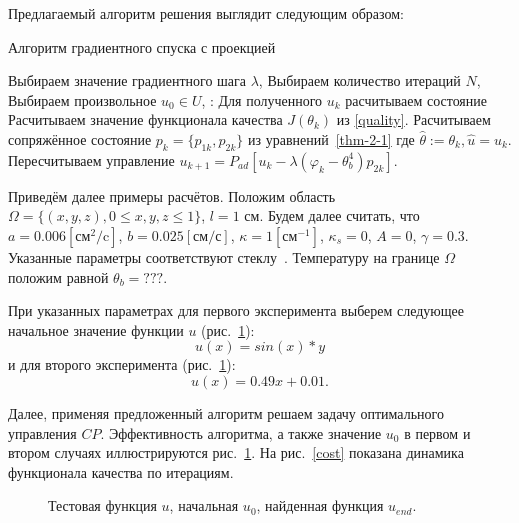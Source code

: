 \documentclass[10pt]{article}
\begin{document}
    Предлагаемый алгоритм решения выглядит следующим образом:
    \begin{algorithm}[H]
        \caption{Алгоритм градиентного спуска с проекцией}
        \begin{algorithmic}[1]
            \State Выбираем значение градиентного шага $\lambda$,
            \State Выбираем количество итераций $N$,
            \State Выбираем произвольное $u_0 \in U$,
            :
            \State Для полученного $u_k$ расчитываем состояние
            \State Расчитываем значение функционала качества $J(\theta_k)$ из \eqref{quality}.
            \State Расчитываем сопряжённое состояние $p_k=\{p_{1k},p_{2k}\}$ из
            уравнений~\eqref{thm-2-1} где $ \hat{\theta} := \theta_k, \hat{u}=u_k$.
            \State Пересчитываем управление
            $u_{k+1} = P_{ad}\left[ u_k - \lambda (\varphi_k - \theta_b^4)p_{2k} \right]$.
            \EndFor
        \end{algorithmic}
    \end{algorithm}
    Приведём далее примеры расчётов.
    Положим область $\Omega = \{(x, y, z), 0 \leq x, y, z \leq 1\}$, $l = 1$ см.
    Будем далее считать, что $a = 0.006[\text{см}^2/\text{c}]$, $b=0.025[\text{см}/\text{с}]$,
    $\kappa=1[\text{см}^{-1}]$, $\kappa_s = 0$, $A = 0$, $\gamma = 0.3$.
    Указанные параметры соответствуют стеклу~\cite{grenkin_13}.
    Температуру на границе $\Omega$ положим равной $\theta_b = ???$.

    При указанных параметрах для первого эксперимента выберем следующее начальное значение
    функции $u$ (рис.~\ref{control}):
    \begin{equation}
        \label{test_function_1}
        u(x)= sin(x) * y
    \end{equation}
    и для второго эксперимента (рис.~\ref{control}):
    \begin{equation}
        \label{test_function_2}
        u(x)=0.49x+0.01.
    \end{equation}

    Далее, применяя предложенный алгоритм решаем задачу оптимального управления $CP$.
    Эффективность алгоритма, а также значение $u_0$
    в первом и втором случаях иллюстрируются рис.~\ref{control}.
    На рис.~\ref{cost} показана динамика функционала качества по итерациям.

    \begin{figure}[H]
        \centering
        \caption{Тестовая функция $u$, начальная $u_0$, найденная функция $u_{end}.$}
        \label{control}
    \end{figure}
\end{document}

